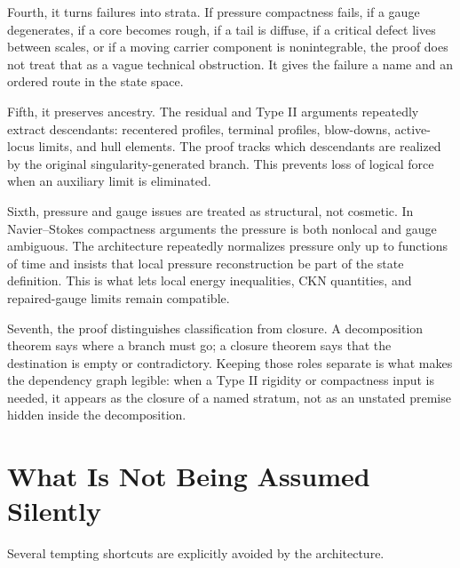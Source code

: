 \documentclass[11pt]{amsart}
\begin{document}
Fourth, it turns failures into strata.  If pressure compactness fails, if a gauge degenerates, if a core becomes rough, if a tail is diffuse, if a critical defect lives between scales, or if a moving carrier component is nonintegrable, the proof does not treat that as a vague technical obstruction. It gives the failure a name and an ordered route in the state space.

Fifth, it preserves ancestry.  The residual and Type II arguments repeatedly extract descendants: recentered profiles, terminal profiles, blow-downs, active-locus limits, and hull elements.  The proof tracks which descendants are realized by the original singularity-generated branch.  This prevents loss of logical force when an auxiliary limit is eliminated.

Sixth, pressure and gauge issues are treated as structural, not cosmetic.  In Navier--Stokes compactness arguments the pressure is both nonlocal and gauge ambiguous.  The architecture repeatedly normalizes pressure only up to functions of time and insists that local pressure reconstruction be part of the state definition.  This is what lets local energy inequalities, CKN quantities, and repaired-gauge limits remain compatible.

Seventh, the proof distinguishes classification from closure.  A decomposition theorem says where a branch must go; a closure theorem says that the destination is empty or contradictory.  Keeping those roles separate is what makes the dependency graph legible: when a Type II rigidity or compactness input is needed, it appears as the closure of a named stratum, not as an unstated premise hidden inside the decomposition.

\section{What Is Not Being Assumed Silently}

Several tempting shortcuts are explicitly avoided by the architecture.
\end{document}
